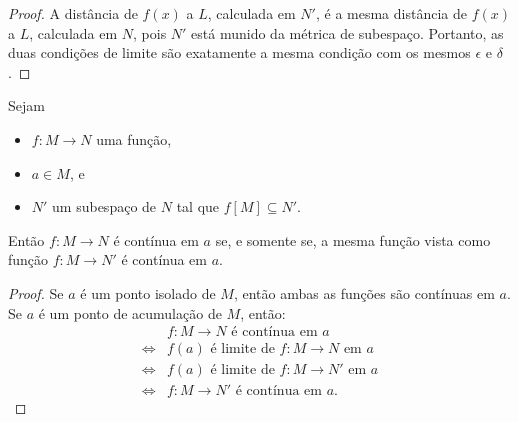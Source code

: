 \begin{proof}
    A distância de $f(x)$ a $L$, calculada em $N'$, é a mesma distância de $f(x)$ a $L$, calculada em $N$, pois $N'$ está munido da métrica de subespaço.
    Portanto, as duas condições de limite são exatamente a mesma condição com os mesmos $\epsilon$ e $\delta$.
\end{proof}


\begin{corollary}
    Sejam
    \begin{itemize}
        \item $f: M \to N$ uma função,
        \item $a \in M$, e
        \item $N'$ um subespaço de $N$ tal que $f[M]\subseteq N'$.
    \end{itemize}

    Então $f:M\to N$ é contínua em $a$ se, e somente se, a mesma função vista como função $f:M\to N'$ é contínua em $a$.
\end{corollary}

\begin{proof}
    Se $a$ é um ponto isolado de $M$, então ambas as funções são contínuas em $a$.
    Se $a$ é um ponto de acumulação de $M$, então:
    \begin{align*}
            & f:M\to N \text{ é contínua em } a\\
        \iff & f(a) \text{ é limite de } f:M\to N \text{ em } a\\
        \iff & f(a) \text{ é limite de } f:M\to N' \text{ em } a\\
        \iff & f:M\to N' \text{ é contínua em } a.
    \end{align*}
\end{proof}

